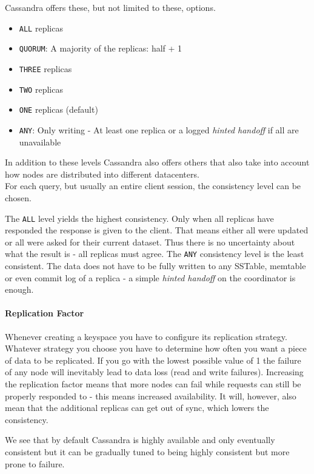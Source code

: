 Cassandra offers these, but not limited to these, options. \autocite{datastax_consistency_level}

\begin{itemize}
  \item \texttt{ALL} replicas
  \item \texttt{QUORUM}: A majority of the replicas: half + 1
  \item \texttt{THREE} replicas
  \item \texttt{TWO} replicas
  \item \texttt{ONE} replicas (default)
  \item \texttt{ANY}: Only writing - At least one replica or a logged \textit{hinted handoff} if all are unavailable
\end{itemize}

In addition to these levels Cassandra also offers others that also take into account how nodes are distributed into different datacenters. \\
For each query, but usually an entire client session, the consistency level can be chosen.

The \texttt{ALL} level yields the highest consistency. Only when all replicas have responded the response is given to the client. That means either all were updated or all were asked for their current dataset. Thus there is no uncertainty about what the result is - all replicas must agree. The \texttt{ANY} consistency level is the least consistent. The data does not have to be fully written to any SSTable, memtable or even commit log of a replica - a simple \textit{hinted handoff} on the coordinator is enough. \autocite[6,7]{cassandraInCAPtheorem}

\paragraph{Replication Factor} Whenever creating a keyspace you have to configure its replication strategy. Whatever strategy you choose you have to determine how often you want a piece of data to be replicated. If you go with the lowest possible value of 1 the failure of any node will inevitably lead to data loss (read and write failures). Increasing the replication factor means that more nodes can fail while requests can still be properly responded to - this means increased availability. It will, however, also mean that the additional replicas can get out of sync, which lowers the consistency. \autocite[3]{lakshman2010cassandra}

We see that by default Cassandra is highly available and only eventually consistent but it can be gradually tuned to being highly consistent but more prone to failure. \autocite[2,3]{cassandraInCAPtheorem}

